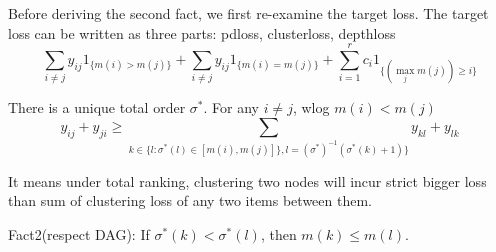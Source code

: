 Before deriving the second fact, we first re-examine the target loss. The target loss can be written as three parts: pdloss, clusterloss, depthloss$$\sum\limits_{i\not=j}y_{ij}1_{\{m(i)> m(j)\}}+\sum\limits_{i\not=j}y_{ij}1_{\{m(i)= m(j)\}}+\sum\limits_{i=1}^rc_i1_{\{(\max_jm(j))\geq i\}}$$

\begin{assumption}
	There is a unique total order $\sigma^*$. For any  $i\not=j $, wlog $m(i)<m(j)$
	$$y_{ij}+y_{ji}\geq \sum\limits_{k\in \{l: \sigma^*(l)\in [m(i), m(j)]\}, l={(\sigma^*)}^{-1}(\sigma^*(k)+1)\}}y_{kl}+y_{lk}$$
\end{assumption}
It means under total ranking, clustering two nodes will incur strict bigger loss than sum of  clustering loss of any two items between them. 

\begin{lemma}
Fact2(respect DAG): If $\sigma^*(k)<\sigma^*(l)$, then $m(k)\leq m(l)$.
\end{lemma}
